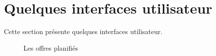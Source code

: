 \section{Quelques interfaces utilisateur}
Cette section présente quelques interfaces utilisateur.
\begin{figure}%
    \centering
    \qquad
    \caption{Les offres planifiés}%
\end{figure}
